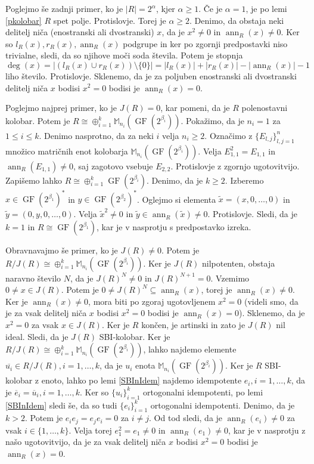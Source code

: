 \documentclass[a4paper, 12pt]{amsart}
\theoremstyle{definition} %
\theoremstyle{plain} %
\newcommand{\M}{\mathbb M}
\DeclareMathOperator{\ann}{ann}
\DeclareMathOperator{\GF}{GF}
\begin{document}
Poglejmo še zadnji primer, ko je $|R| = 2^\alpha$, kjer $\alpha\ge 1$. Če je $\alpha = 1$, je po lemi \ref{pkolobar} $R$ spet polje. Protislovje. Torej je $\alpha \ge 2$. Denimo, da obstaja neki delitelj niča (enostranski ali dvostranski) $x$, da je $x^2 \neq 0$ in $\ann_R(x) \neq 0$. Ker so $l_R(x), r_R(x), \ann_R(x)$ podgrupe in ker po zgornji predpostavki niso trivialne, sledi, da so njihove moči soda števila. Potem je stopnja 
$$
\deg(x) = |(l_R(x) \cup r_R(x)) \setminus \{0\}| = |l_R(x) | + |r_R(x)| - |\ann_R(x)| - 1
$$
liho število. Protislovje. Sklenemo, da je za poljuben enostranski ali dvostranski delitelj niča $x$ bodisi $x^2 = 0$ bodisi je $\ann_R(x) = 0$. 

Poglejmo najprej primer, ko je $J(R) = 0$, kar pomeni, da je $R$ polenostavni kolobar. Potem je $R\cong \oplus _{i=1}^k \M_{n_i}(\GF(2^{\beta_i}))$. Pokažimo, da je $n_i = 1$ za $1\le i \le k$. Denimo nasprotno, da za neki $i$ velja $n_i\ge 2$. Označimo z $\{E_{l,j}\}_{l,j=1}^n$ množico matričnih enot kolobarja $\M_{n_i}(\GF(2^{\beta_i}))$. Velja $E_{1,1}^2 = E_{1,1}$ in $\ann_R(E_{1,1})\neq 0$, saj zagotovo vsebuje $E_{2,2}$. Protislovje z zgornjo ugotovitvijo. Zapišemo lahko $R\cong \oplus _{i=1}^k \GF(2^{\beta_i})$. Denimo, da je $k\ge 2$. Izberemo $x\in \GF(2^{\beta_1})^*$ in $y\in \GF(2^{\beta_2})^*$. Oglejmo si elementa $\tilde{x} = (x,0,\dots,0)$ in $\tilde{y} = (0,y,0,\dots,0)$. Velja $\tilde{x}^2 \neq 0$ in $\tilde{y}\in \ann_R(\tilde{x}) \neq 0$. Protislovje. Sledi, da je $k=1$ in $R\cong \GF(2^{\beta_1})$, kar  je v nasprotju s predpostavko izreka.

Obravnavajmo še primer, ko je $J(R)\neq 0$. Potem je $R/J(R) \cong \oplus_{i=1}^k \M_{n_i}(\GF(2^{\beta_i}))$. Ker je $J(R)$ nilpotenten, obstaja naravno število $N$, da je $J(R)^N \neq 0$ in $J(R)^{N+1} = 0$. Vzemimo $0\neq x\in J(R)$. Potem je $0\neq J(R)^N \subseteq \ann_R(x)$, torej je $\ann_R(x) \neq 0$. Ker je $\ann_R(x) \neq 0$, mora biti po zgoraj ugotovljenem $x^2 = 0$ (videli smo, da je za vsak delitelj niča $x$ bodisi $x^2 = 0$ bodisi je $\ann_R(x) = 0$). Sklenemo, da je $x^2 = 0$ za vsak $x\in J(R)$. Ker je $R$ končen, je artinski in zato je $J(R)$ nil ideal. Sledi, da je $J(R)$ SBI-kolobar. Ker je $R/J(R)\cong \oplus_{i=1}^k \M_{n_i}(\GF(2^{\beta_i})) $, lahko najdemo elemente $\overline{u_i} \in R/J(R), i=1,\dots,k$, da je $u_i$ enota $\M_{n_i}(\GF(2^{\beta_i}))$. Ker je $R$ SBI-kolobar z enoto, lahko po lemi \ref{SBInIdem} najdemo idempotente $e_i, i=1,\dots,k$, da je $\overline{e}_i = \overline{u}_i, i=1,\dots,k$. Ker so $\{u_i\}_{i=1}^k$ ortogonalni idempotenti, po lemi \ref{SBInIdem} sledi še, da so tudi $\{e_i\}_{i=1}^k$ ortogonalni idempotenti.
Denimo, da je $k>2$.
Potem je $e_i e_j = e_j e_i=0$ za $i\neq j$. Od tod sledi, da je $\ann_R(e_i) \neq 0$ za vsak $i\in \{1, \dots,k\}$. Velja torej $e_1^2 = e_1 \neq 0$ in $\ann_R(e_1)\neq 0$, kar je v nasprotju z našo ugotovitvijo, da je za vsak delitelj niča $x$ bodisi $x^2 = 0$ bodisi je $\ann_R(x) = 0$.
\end{document}
